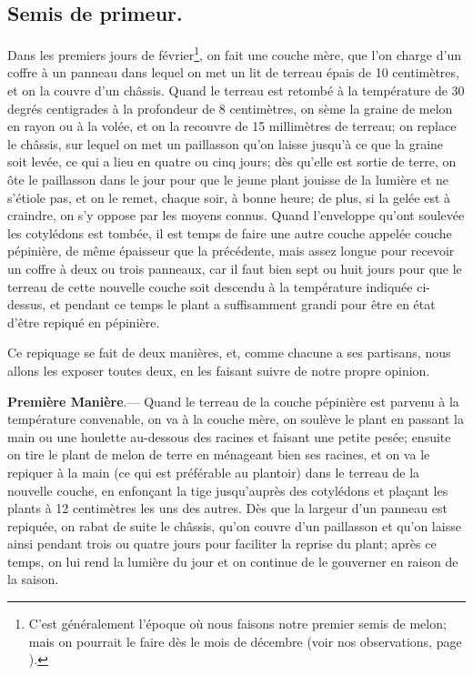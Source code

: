 \documentclass[10pt,a4paper]{book}
\begin{document}
\subsection{Semis de primeur.}

Dans les premiers jours de février\footnote{C'est généralement l'époque où nous faisons notre premier semis de melon; mais on pourrait le faire dès le mois de décembre (voir nos observations, page \pageref{radisnoirobservations}).}, on fait une couche mère, que l'on charge d'un coffre à un panneau dans lequel on met un lit de terreau épais de 10 centimètres, et on la couvre d'un châssis. Quand le terreau est retombé à la température de 30 degrés centigrades à la profondeur de 8 centimètres, on sème la graine de melon en rayon ou à la volée, et on la recouvre de 15 millimètres de terreau; on replace le châssis, sur lequel on met un paillasson qu'on laisse jusqu'à ce que la graine soit levée, ce qui a lieu en quatre ou cinq jours; dès qu'elle est sortie de terre, on ôte le paillasson dans le jour pour que le jeune plant jouisse de la lumière et ne s'étiole pas, et on le remet, chaque soir, à bonne heure; de plus, si la gelée est à craindre, on s'y oppose par les moyens connus. Quand l'enveloppe qu'ont soulevée les cotylédons est tombée, il est temps de faire une autre couche appelée couche pépinière, de même épaisseur que la précédente, mais assez longue pour recevoir un coffre à deux ou trois panneaux, car il faut bien sept ou huit jours pour que le terreau de cette nouvelle couche soit descendu à la température indiquée ci-dessus, et pendant ce temps le plant a suffisamment grandi pour être en état d'être repiqué en pépinière.

Ce repiquage se fait de deux manières, et, comme chacune a ses partisans, nous allons les exposer toutes deux, en les faisant suivre de notre propre opinion.

\textbf{Première Manière}.--- Quand le terreau de la couche pépinière est parvenu à la température convenable, on va à la couche mère, on soulève le plant en passant la main ou une houlette au-dessous des racines et faisant une petite pesée; ensuite on tire le plant de melon de terre en ménageant bien ses racines, et on va le repiquer à la main (ce qui est préférable au plantoir) dans le terreau de la nouvelle couche, en enfonçant la tige jusqu'auprès des cotylédons et plaçant les plants à 12 centimètres les uns des autres. Dès que la largeur d'un panneau est repiquée, on rabat de suite le châssis, qu'on couvre d'un paillasson et qu'on laisse ainsi pendant trois ou quatre jours pour faciliter la reprise du plant; après ce temps, on lui rend la lumière du jour et on continue de le gouverner en raison de la saison.
\end{document}
